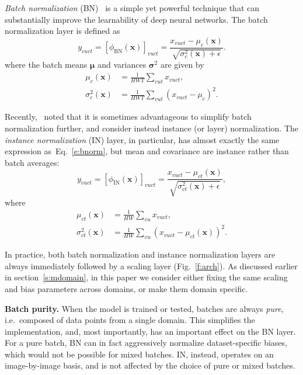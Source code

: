 \documentclass[10pt,twocolumn,letterpaper]{article}
\newcommand{\bx}{\mathbf{x}}
\newcommand{\bs}[1]{\boldsymbol{#1}}
\renewcommand{\paragraph}[1]{\par\medskip\noindent\textbf{#1}}
\begin{document}
\emph{Batch normalization} (BN)~\cite{ioffe15batch} is a simple yet powerful technique that can substantially improve the learnability of deep neural networks. The batch normalization layer is defined as
\begin{equation}\label{e:bnorm}
y_{vuct}
=
[\phi_{\text{BN}}(\bs\bx)]_{vuct}
=
\frac{x_{vuct} - \mu_c(\bx)}{\sqrt{\sigma_c^2(\bx)+\epsilon}}.
\end{equation}
where the batch means $\bs\mu$ and variances $\bs\sigma^2$ are given by
\begin{align*}
 \mu_{c}(\bx) &= \frac{1}{HWT}\sum_{vut} x_{vuct},\\
 \sigma^2_{c}(\bx) &= \frac{1}{HWT}\sum_{vut} (x_{vuct} - \mu_c)^2.
\end{align*}

Recently,~\cite{ulyanov16instance,ba16layer} noted that it is sometimes advantageous to simplify batch normalization further, and consider instead instance (or layer) normalization. The \emph{instance normalization} (IN) layer, in particular, has almost exactly the same expression as~Eq.~\ref{e:bnorm}, but mean and covariance are instance rather than batch averages:
\begin{equation}\label{e:inorm}
y_{vuct}
=
[\phi_{\text{IN}}(\bs\bx)]_{vuct}
=
\frac{x_{vuct} - \mu_{ct}(\bx)}{\sqrt{\sigma_{ct}^2(\bx)+\epsilon}},
\end{equation}
where
\begin{align*}
 \mu_{ct}(\bx) &= \frac{1}{HW}\sum_{vu} x_{vuct},\\
 \sigma^2_{ct}(\bx) &= \frac{1}{HW}\sum_{vu} (x_{vuct} - \mu_{ct}(\bx))^2.
\end{align*}

In practice, both batch normalization and instance normalization layers are always immediately followed by a scaling layer (Fig.~\ref{f:arch}). As discussed earlier in section~\ref{s:mdomain}, in this paper we consider either fixing the same scaling and bias parameters across domains, or make them domain specific.

\paragraph{Batch purity.} When the model is trained or tested, batches are always \emph{pure}, i.e.\ composed of data points from a single domain. This simplifies the implementation, and, most importantly, has an important effect on the BN layer. For a pure batch, BN can in fact aggressively normalize dataset-specific biases, which would not be possible for mixed batches. IN, instead, operates on an image-by-image basis, and is not affected by the choice of pure or mixed batches.
\end{document}
